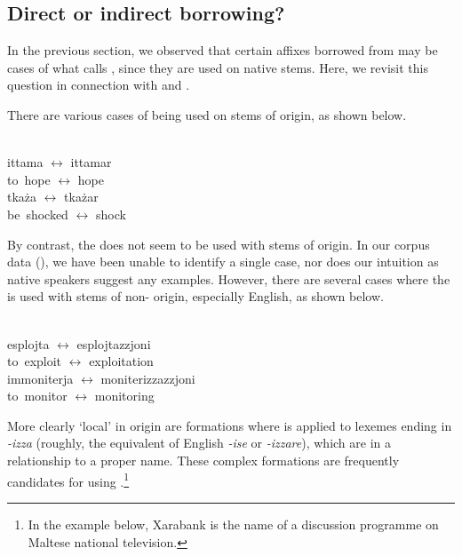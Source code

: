 \documentclass[output=paper]{LSP/langsci}
\begin{document}
\largerpage%
\subsection{Direct or indirect borrowing?}\label{sec:dir-indir}
In the previous section, we observed that certain affixes borrowed from  may be cases of what \citet{Seifart2015} calls , since they are used on native stems. Here, we revisit this question in connection with {\ar} and \zjoni. 

There are various cases of {\ar} being used on stems of  origin, as shown below.

\ea\label{ex:ar}
\\
\gll ittama $\leftrightarrow$ ittamar\\
     to~hope $\leftrightarrow$ hope\\
\gll tkaża $\leftrightarrow$ tkażar\\
    be~shocked $\leftrightarrow$ shock\\
\z

By contrast, the  {\zjoni} does not seem to be used with stems of  origin. In our corpus data (), we have been unable to identify a single case, nor does our intuition as native speakers suggest any examples. However, there are several cases where the  is used with stems of non- origin, especially English, as shown below.

\ea\label{ex:zjoni-base}
\\
\gll  esplojta $\leftrightarrow$ esplojtazzjoni\\
		to~exploit $\leftrightarrow$ exploitation\\
\gll immoniterja $\leftrightarrow$ moniterizzazzjoni\\
	to~monitor $\leftrightarrow$ monitoring\\
\z

More clearly `local' in origin are formations where {\zjoni} is applied to lexemes ending in \textit{-izza} (roughly, the equivalent of English \textit{-ise} or  \textit{-izzare}), which are in a  relationship to a proper name. These complex formations are frequently candidates for  using \zjoni.\footnote{In the example below, Xarabank is the name of a discussion programme on Maltese national television.}
\end{document}
